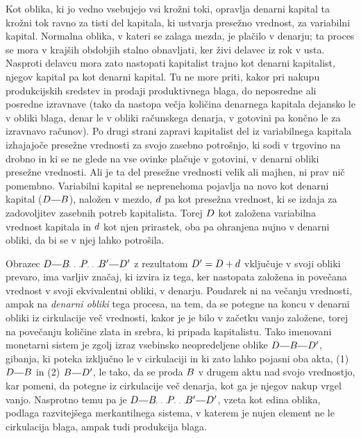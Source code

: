 \documentclass[kapital_02.tex]{subfiles}
\begin{document}
Kot oblika, ki jo vedno vsebujejo vsi krožni toki, opravlja denarni kapital ta krožni tok ravno za tisti del kapitala, ki ustvarja presežno vrednost, za variabilni kapital. Normalna oblika, v kateri se zalaga mezda, je plačilo v denarju; ta proces se mora v krajših obdobjih stalno obnavljati, ker živi delavec iz rok v usta. Nasproti delavcu mora zato nastopati kapitalist trajno kot denarni kapitalist, njegov kapital pa kot denarni kapital. Tu ne more priti, kakor pri nakupu produkcijskih sredstev in prodaji produktivnega blaga, do neposredne ali posredne izravnave (tako da nastopa večja količina denarnega kapitala dejansko le v obliki blaga, denar le v obliki računskega denarja, v gotovini pa končno le za izravnavo računov). Po drugi strani zapravi kapitalist del iz variabilnega kapitala izhajajoče presežne vrednosti za svojo zasebno potrošnjo, ki sodi v trgovino na drobno in ki se ne glede na vse ovinke plačuje v gotovini, v denarni obliki presežne vrednosti. Ali je ta del presežne vrednosti velik ali majhen, ni prav nič pomembno. Variabilni kapital se neprenehoma pojavlja na novo kot denarni kapital (\(\KPED\KPEcrta\KPEB\)), naložen v mezdo, \(d\) pa kot presežna vrednost, ki se izdaja za zadovoljitev zasebnih potreb kapitalista. Torej \(D\) kot založena variabilna vrednost kapitala in \(d\) kot njen prirastek, oba pa ohranjena nujno v denarni obliki, da bi se v njej lahko potrošila.

Obrazec \( \KPED \KPEcrta \KPEB \KPEpike \KPEP \KPEpike \KPEB' \KPEcrta \KPED' \) z rezultatom \( D' = D + d \) vključuje v svoji obliki prevaro, ima varljiv značaj, ki izvira iz tega, ker nastopata založena in povečana vrednost v svoji ekvivalentni obliki, v denarju. Poudarek ni na večanju vrednosti, ampak na \emph{denarni obliki} tega procesa, na tem, da se potegne na koncu v denarni obliki iz cirkulacije več vrednosti, kakor je je bilo v začetku vanjo založene, torej na povečanju količine zlata in srebra, ki pripada kapitalistu. Tako imenovani monetarni sistem je zgolj izraz vsebinsko neopredeljene oblike \( \KPED \KPEcrta \KPEB \KPEcrta \KPED' \), gibanja, ki poteka izključno le v cirkulaciji in ki zato lahko pojasni oba akta, (1) \( \KPED \KPEcrta \KPEB \) in (2) \( \KPEB \KPEcrta \KPED' \), le tako, da se proda \( B \) v drugem aktu nad svojo vrednostjo, kar pomeni, da potegne iz cirkulacije več denarja, kot ga je njegov nakup vrgel vanjo. Nasprotno temu pa je \( \KPED \KPEcrta \KPEB \KPEpike \KPEP \KPEpike \KPEB' \KPEcrta \KPED' \), vzeta kot edina oblika, podlaga razvitejšega merkantilnega sistema, v katerem je nujen element ne le cirkulacija blaga, ampak tudi produkcija blaga.
\end{document}
